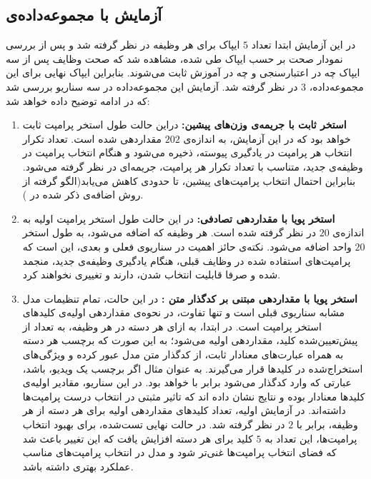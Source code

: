 \subsection{آزمایش با مجموعه‌داده‌ی }
در این آزمایش ابتدا تعداد $5$ ایپاک برای هر وظیفه در نظر گرفته شد و پس از بررسی نمودار صحت بر حسب ایپاک طی شده، مشاهده شد که صحت وظایف پس از سه ایپاک چه در اعتبارسنجی و چه در آموزش ثابت می‌شوند. بنابراین ایپاک نهایی برای این مجموعه‌داده، $3$ در نظر گرفته شد. آزمایش این مجموعه‌داده در سه سناریو بررسی شد که در ادامه توضیح داده خواهد شد: 
\begin{enumerate}
	\item \textbf{استخر ثابت با جریمه‌ی وزن‌های پیشین:} 
	دراین حالت طول استخر پرامپت ثابت خواهد بود که در این آزمایش، به اندازه‌ی $202$ مقداردهی شده است. تعداد تکرار انتخاب هر پرامپت در یادگیری پیوسته، ذخیره می‌شود و هنگام انتخاب پرامپت در وظیفه‌ی جدید، متناسب با تعداد تکرار هر پرامپت، جریمه‌ای در نظر گرفته می‌شود. بنابراین احتمال انتخاب پرامپت‌های پیشین، تا حدودی کاهش می‌یابد(الگو گرفته از روش اضافه‌ی ذکر شده در  \cite{l2p}).  
	\item \textbf{استخر پویا با مقداردهی تصادفی:}
	در این حالت طول استخر پرامپت اولیه به اندازه‌ی $20$ در نظر گرفته شده است. هر وظیفه‌‌ که اضافه می‌شود، به طول استخر $20$ واحد اضافه می‌شود. نکته‌ی حائز اهمیت در سناریوی فعلی و بعدی، این است که پرامپت‌های استفاده شده در وظایف قبلی، هنگام یادگیری وظیفه‌ی جدید، منجمد شده و صرفا قابلیت انتخاب شدن، دارند و تغییری نخواهند کرد. 
	\item \textbf{استخر پویا با مقداردهی مبتنی بر کدگذار متن :}
	در این حالت، تمام تنظیمات مدل مشابه سناریوی قبلی است و تنها تفاوت، در نحوه‌ی مقداردهی اولیه‌ی کلیدهای استخر پرامپت است. در ابتدا، به ازای هر دسته‌ در هر وظیفه، به تعداد از پیش‌تعیین‌شده کلید، مقداردهی اولیه می‌شود؛ به این صورت که برچسب هر دسته به همراه عبارت‌های معنادار ثابت، از کدگذار متن مدل  عبور کرده و ویژگی‌های استخراج‌شده در کلیدها قرار می‌گیرند. به عنوان مثال اگر برچسب یک ویدیو،   باشد، عبارتی که وارد کدگذار می‌شود برابر با  خواهد بود. در این سناریو، مقادیر اولیه‌ی کلیدها معنادار بوده و نتایج نشان داده اند که تاثیر مثبتی در انتخاب درست پرامپت‌ها داشته‌اند. در آزمایش اولیه، تعداد کلیدهای مقداردهی اولیه برای هر دسته از هر وظیفه‌، برابر با $2$ در نظر گرفته شد. در حالت نهایی تست‌شده، برای بهبود انتخاب پرامپت‌ها، این تعداد به $5$ کلید برای هر دسته افزایش یافت که این تغییر باعث شد که فضای انتخاب پرامپت‌ها غنی‌تر شود و مدل در انتخاب پرامپت‌های مناسب عملکرد بهتری داشته باشد.
\end{enumerate}

